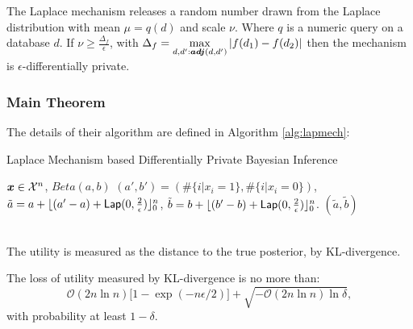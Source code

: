 \documentclass{article}
\begin{document}
\begin{defn}
The Laplace mechanism releases a random number drawn from the Laplace distribution with
mean $\mu=q(d)$ and scale $\nu$. Where $q$ is a numeric query on a database $d$.
If $\nu\geq \frac{\Delta_f}{\epsilon}$, with $\Delta_f=\displaystyle\max_{d,d':\boldsymbol{adj}(d,d')}{\lvert f(d_1)-f(d_2)\lvert}$
then the mechanism is $\epsilon$-differentially private.
\end{defn}


\subsubsection{Main Theorem}
The details of their algorithm are defined in Algorithm \ref{alg:lapmech}:
%
\begin{algorithm}
  \caption{Laplace Mechanism based Differentially Private Bayesian Inference}
  \label{alg:lapmech}
  \begin{algorithmic}
  \STATE $\boldsymbol{x}\in\mathcal{X}^n$, $Beta(a, b)$
  \STATE {} $(a', b') = (\#\{i | x_i = 1\}, \#\{i | x_i = 0\})$, 
  \STATE {} $\tilde{a} = a + \lfloor{(a' - a)+ \mathsf{Lap}(0, \frac{2}{\epsilon}) }\rfloor^n_0$,
  $\tilde{b} = b + \lfloor{(b' - b)+ \mathsf{Lap}(0, \frac{2}{\epsilon}) }\rfloor^n_0$.
   $(\tilde{a}, \tilde{b})$
  \end{algorithmic}
\end{algorithm}
%
\\
The utility is measured as the distance to the true posterior, by KL-divergence. 
\begin{thm}
The loss of utility measured by KL-divergence is no more than:
\[
	\mathcal{O}(2n\ln n)\big[ 1 - \exp(-n\epsilon / 2) \big] + \sqrt{-\mathcal{O}(2 n \ln n) \ln \delta},
\]
with probability at least $1 - \delta$.
\end{thm}
%
%
\end{document}
